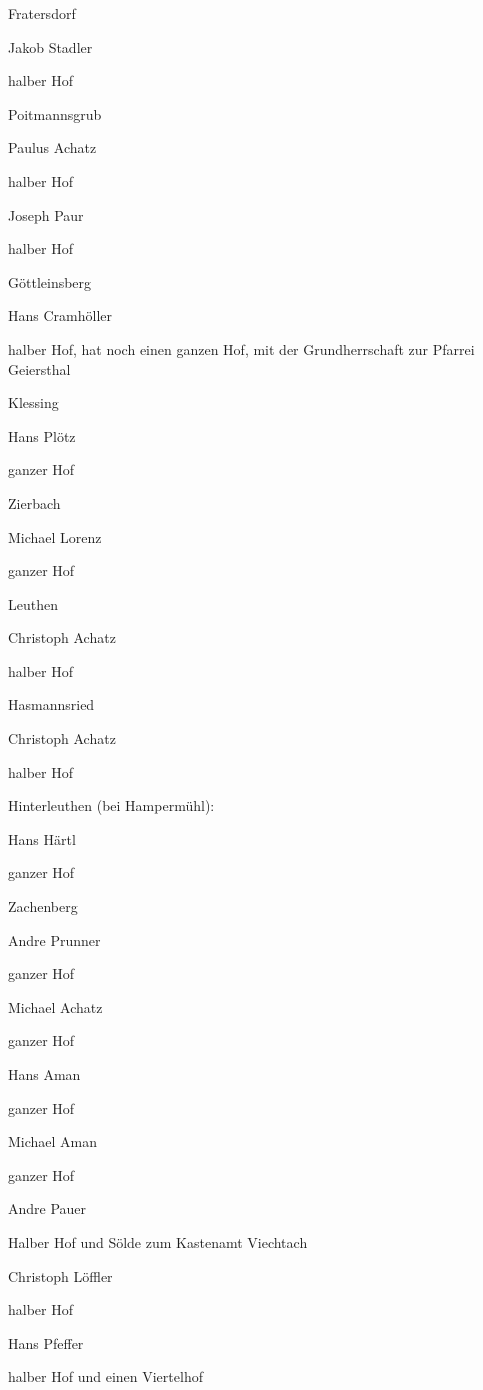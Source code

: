 \documentclass{book}
\begin{document}
Fratersdorf

Jakob Stadler

halber Hof

Poitmannsgrub

Paulus Achatz

halber Hof



Joseph Paur

halber Hof

Göttleinsberg

Hans Cramhöller

halber Hof, hat noch einen ganzen Hof, mit der Grundherrschaft zur Pfarrei
Geiersthal

Klessing

Hans Plötz

ganzer Hof

Zierbach

Michael Lorenz

ganzer Hof

Leuthen

Christoph Achatz

halber Hof

Hasmannsried

Christoph Achatz

halber Hof

Hinterleuthen (bei Hampermühl):

Hans Härtl

ganzer Hof

Zachenberg

Andre Prunner

ganzer Hof



Michael Achatz

ganzer Hof



Hans Aman

ganzer Hof



Michael Aman

ganzer Hof



Andre Pauer

Halber Hof und Sölde zum Kastenamt Viechtach



Christoph Löffler

halber Hof



Hans Pfeffer

halber Hof und einen Viertelhof
\end{document}
